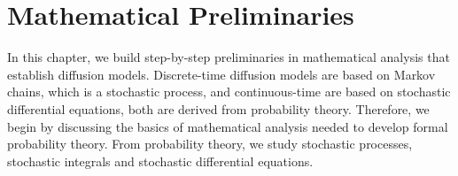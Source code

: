 \chapter{Mathematical Preliminaries}
In this chapter, we build step-by-step preliminaries in mathematical analysis that establish diffusion models. Discrete-time diffusion models are based on Markov chains, which is a stochastic process, and continuous-time are based on stochastic differential equations, both are derived from probability theory. Therefore, we begin by discussing the basics of mathematical analysis needed to develop formal probability theory. From probability theory, we study stochastic processes, stochastic integrals and stochastic differential equations.







